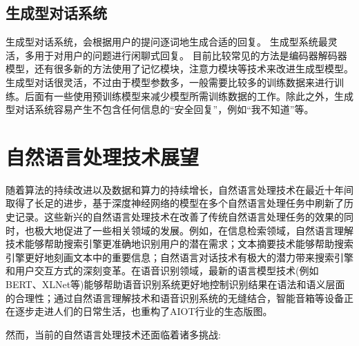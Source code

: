 \documentclass[graybox,envcountchap,sectrefs]{svmono}
\begin{document}
\subsection{生成型对话系统}
生成型对话系统\citep{sutskever2014sequence,shang2015neural,serban2016building,serban2016hierarchical}，会根据用户的提问逐词地生成合适的回复。
生成型系统最灵活，多用于对用户的问题进行闲聊式回复。
目前比较常见的方法是编码器解码器模型，还有很多新的方法使用了记忆模块，注意力模块等技术来改进生成型模型。
生成型对话很灵活，不过由于模型参数多，一般需要比较多的训练数据来进行训练。后面有一些使用预训练模型来减少模型所需训练数据的工作。除此之外，生成型对话系统容易产生不包含任何信息的``安全回复''，例如``我不知道''等。




\section{自然语言处理技术展望}

随着算法的持续改进以及数据和算力的持续增长，自然语言处理技术在最近十年间取得了长足的进步，基于深度神经网络的模型在多个自然语言处理任务中刷新了历史记录。这些新兴的自然语言处理技术在改善了传统自然语言处理任务的效果的同时，也极大地促进了一些相关领域的发展。例如，在信息检索领域，自然语言理解技术能够帮助搜索引擎更准确地识别用户的潜在需求；文本摘要技术能够帮助搜索引擎更好地刻画文本中的重要信息；自然语言对话技术有极大的潜力带来搜索引擎和用户交互方式的深刻变革。在语音识别领域，最新的语言模型技术(例如BERT、XLNet等\cite{devlin2018bert, yang2019xlnet, song2019topic})能够帮助语音识别系统更好地控制识别结果在语法和语义层面的合理性；通过自然语言理解技术和语音识别系统的无缝结合，智能音箱等设备正在逐步走进人们的日常生活，也重构了AIOT行业的生态版图。

然而，当前的自然语言处理技术还面临着诸多挑战:
\end{document}
